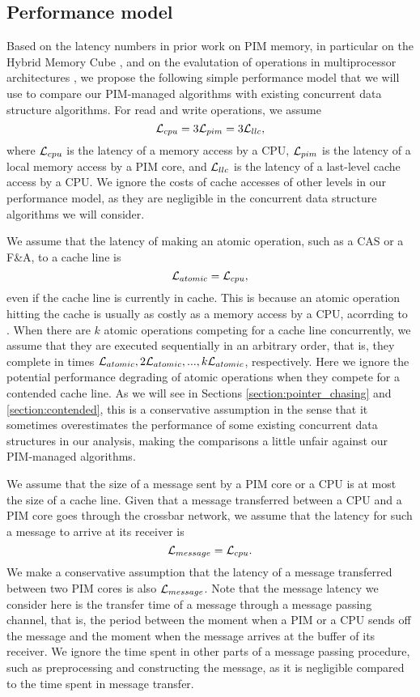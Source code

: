 \subsection{Performance model}
\label{section:performance_model}
Based on the latency numbers in prior work on PIM memory, in particular on the Hybrid Memory Cube 
\cite{website:HMC, Azarkhish16}, 
and on the evalutation of operations in multiprocessor architectures \cite{David13},
we propose the following simple performance model that we will use to compare
our PIM-managed algorithms with existing concurrent data structure algorithms.
For read and write operations, we assume 
$$\mathcal{L}_{cpu} = 3\mathcal{L}_{pim} = 3\mathcal{L}_{llc},$$
where $\mathcal{L}_{cpu}$ is the latency of a memory access by a CPU,
$\mathcal{L}_{pim}$ is the latency of a local memory access by a PIM core, and
$\mathcal{L}_{llc}$ is the latency of a last-level cache access by a CPU.
We ignore the costs of cache accesses of other levels in our performance model,
as they are negligible in the concurrent data structure algorithms we will consider.

We assume that the latency of making an atomic operation, such as a CAS or a F\&A,
to a cache line is 
$$\mathcal{L}_{atomic} = \mathcal{L}_{cpu},$$ 
even if the cache line is currently in cache.
This is because an atomic operation hitting the cache is usually 
as costly as a memory access by a CPU, acorrding to \cite{David13}.
When there are $k$ atomic operations competing for a cache line concurrently,
we assume that they are executed sequentially in an arbitrary order, that is,
they complete in times $\mathcal{L}_{atomic}, 2\mathcal{L}_{atomic},..., k\mathcal{L}_{atomic}$, respectively.
Here we ignore the potential performance degrading of atomic operations
when they compete for a contended cache line.
As we will see in Sections \ref{section:pointer_chasing} and
\ref{section:contended}, this is a conservative assumption
in the sense that it sometimes overestimates the performance of some existing
concurrent data structures in our analysis,
making the comparisons a little unfair against our PIM-managed algorithms.


We assume that the size of a message sent by a PIM core or a CPU is at most 
the size of a cache line.
Given that a message transferred between a CPU and a PIM core goes through
the crossbar network, we assume that the latency for such a message to
arrive at its receiver is 
$$\mathcal{L}_{message} = \mathcal{L}_{cpu}.$$
We make a conservative assumption that the latency of a message transferred 
between two PIM cores is also $\mathcal{L}_{message}$.
Note that the message latency we consider here is the transfer time of a message
through a message passing channel, that is, the period between the moment
when a PIM or a CPU sends off the message and the moment when
the message arrives at the buffer of its receiver.
We ignore the time spent in other parts of a message passing procedure,
such as preprocessing and constructing the message,
as it is negligible compared to the time spent in message transfer.
